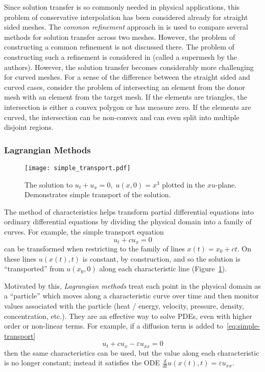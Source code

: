\documentclass[letterpaper,10pt]{article}
\theoremstyle{definition}
\newcommand{\eps}{\varepsilon}
\begin{document}
Since solution transfer is so commonly needed in physical applications, this
problem of conservative interpolation has been considered already for
straight sided meshes. The \emph{common refinement} approach in
\cite{Jiao2004} is used to compare several methods for solution transfer across
two meshes. However, the problem of constructing a common refinement is
not discussed there. The problem of constructing such a refinement is
considered in \cite{Farrell2009, Farrell2011} (called a supermesh by
the authors).
However, the solution transfer becomes considerably more challenging for curved
meshes. For a sense of the difference between the straight sided and curved
cases, consider the problem of intersecting an element from the donor mesh
with an element from the target mesh. If the elements are triangles, the
intersection is either a convex polygon or has measure zero. If the elements
are curved, the intersection can be non-convex and can even split into
multiple disjoint regions.

\subsubsection{Lagrangian Methods}

\begin{figure}
  \texttt{[image: simple\_transport.pdf]}
  \centering
  \captionsetup{width=.75\linewidth}
  \caption{The solution to \(u_t + u_x = 0, \; u(x, 0) = x^3\) plotted in
    the \(xu\)-plane. Demonstrates simple transport of
    the solution.}
  \label{fig:simple-transport}
\end{figure}

The method of characteristics helps transform partial differential equations
into ordinary differential equations by dividing the physical domain into
a family of curves. For example, the simple transport equation
\begin{equation}\label{eq:simple-transport}
u_t + c u_x = 0
\end{equation}
can be transformed when restricting to the family of lines
\(x(t) = x_0 + c t\). On these lines \(u(x(t), t)\) is constant, by
construction, and so the solution is ``transported'' from \(u(x_0, 0)\)
along each characteristic line (Figure~\ref{fig:simple-transport}).

Motivated by this, \emph{Lagrangian methods} treat each point in the
physical domain as a ``particle'' which moves along a characteristic curve
over time and then monitor values associated with the particle (heat / energy,
velocity, pressure, density, concentration, etc.). They are an effective way
to solve PDEs, even with higher order or non-linear terms.
For example, if a diffusion term is added to~\eqref{eq:simple-transport}
\begin{equation}
u_t + c u_x - \eps u_{xx} = 0
\end{equation}
then the same characteristics can be used, but the value
along each characteristic is no longer constant; instead it satisfies the
ODE \(\frac{d}{dt} u(x(t), t) = \eps u_{xx}\).
\end{document}
